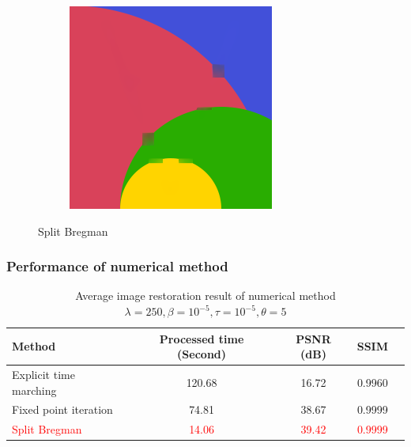 \documentclass[xcolor=dvipsnames, xetex,serif]{beamer}
\begin{document}
\begin{frame}
\begin{figure}[H]
\begin{subfigure}{0.15\linewidth}
            \end{subfigure}
            \begin{subfigure}{0.15\linewidth}
                \centering
                \includegraphics[width=0.9\linewidth]{images/result_ex1/splitbergman05.png}
            \end{subfigure}
            \caption{Split Bregman}
        \end{figure}
    \end{frame}
    \begin{frame}
        \frametitle{Performance of numerical method}
        \begin{table}[H]
        \centering
        \captionsetup{justification=centering}
            \begin{tabular}[ht]{|l|c|c|c|c|}
                \hline
                Method  & Processed time  (Second) & PSNR (dB) & SSIM \\
                \hline
                Explicit time marching & 120.68 & 16.72 & 0.9960 \\
                Fixed point iteration & 74.81 & 38.67 & 0.9999 \\
                \textcolor{red}{Split Bregman} & \textcolor{red}{14.06} & \textcolor{red}{39.42} & \textcolor{red}{0.9999}  \\
                \hline
            \end{tabular}
        \caption{Average image restoration result of numerical method  \\  $\lambda = 250, \beta = 10^{-5}, \tau = 10^{-5}, \theta = 5 $}
        \end{table}	
    \end{frame}
\end{document}
